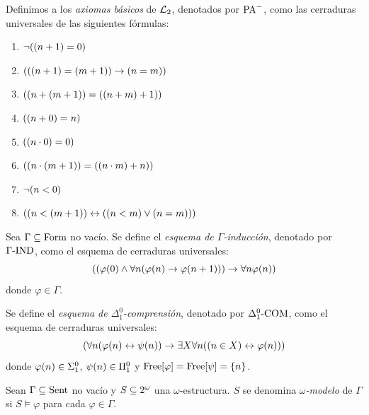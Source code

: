 \begin{definition}
	\label{def: axiomas_base}
	Definimos a los \emph{axiomas básicos} de $\ARITMETICA$, denotados por $\PEANO$, como las cerraduras universales de las siguientes fórmulas:

	\begin{enumerate}
		\item $\neg\pa*{\pa*{n + 1} = 0}$
		\label{def_axiomas: cero_no_es_sucesor}
		\item $\pa*{\pa*{\pa*{n + 1} =\pa*{m + 1}}\to\pa*{n = m}}$
		\label{def_axiomas: sucesor_es_inyectiva}
		\item $\pa*{\pa*{n +\pa*{m + 1}} =\pa*{\pa*{n + m} + 1}}$
		\label{def_axiomas: sucesor_es_asociativo}
		\item $\pa*{\pa*{n + 0} = n}$
		\label{def_axiomas: el_cero_es_identidad}
		\item $\pa*{\pa*{n\cdot 0} = 0}$
		\label{def_axiomas: cero_es_absorbente}
		\item $\pa*{\pa*{n\cdot\pa*{m + 1}} =\pa*{\pa*{n\cdot m} + n}}$
		\label{def_axiomas: producto_es_distributivo}
		\item $\neg\pa*{n < 0}$
		\label{def_axiomas: no_hay_negativos}
		\item $\pa*{\pa*{n <\pa*{m + 1}}\leftrightarrow\pa*{\pa*{n < m}\vee\pa*{n = m}}}$
		\label{def_axiomas: el_menor_o_igual}
	\end{enumerate}
\end{definition}

\begin{definition}
	Sea $\Gamma\subseteq\FORMULAS$ no vacío. Se define el \emph{esquema de $\Gamma$-inducción}, denotado por $\INDUCCION{\Gamma}$, como el esquema de cerraduras universales:
	\[
		\pa*{\pa*{\varphi\pa*{0}\land\forall n\pa*{\varphi\pa*{n}\to\varphi\pa*{n + 1}}}\to\forall n\varphi\pa*{n}}
	\]
	donde $\varphi\in\Gamma$.
\end{definition}

\begin{definition}
	Se define el \emph{esquema de $\Delta_{1}^{0}$-comprensión}, denotado por $\COMPRENSION{\Delta_{1}^{0}}$, como el esquema de cerraduras universales:
	\[
		\pa*{\forall n\pa*{\varphi\pa*{n}\leftrightarrow\psi\pa*{n}}\to\exists X\forall n\pa*{\pa*{n\in X}\leftrightarrow\varphi\pa*{n}}}
	\]
	donde $\varphi\pa*{n}\in\Sigma_{1}^{0}$, $\psi\pa*{n}\in\Pi_{1}^{0}$ y $\mathrm{Free}\bra*{\varphi} =\mathrm{Free}\bra*{\psi} =\set*{n}$.
\end{definition}

\begin{definition}
	Sean $\Gamma\subseteq\ENUNCIADOS$ no vacío y $S\subseteq\CPOTENCIA{\omega}$ una $\omega$-estructura. $S$ se denomina \emph{$\omega$-modelo} de $\Gamma$ si $S\models\varphi$ para cada $\varphi\in\Gamma$.
\end{definition}
